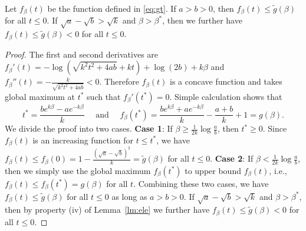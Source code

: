 \documentclass{article}
\begin{document}
\begin{lemma} \label{lm:tus}
Let $f_{\beta}(t)$ be the function defined in \eqref{eq:gt}. If $a>b>0$, then $f_{\beta}(t)\le \tilde{g}(\beta)$ for all $t\le 0$.
If $\sqrt{a}-\sqrt{b}>\sqrt{k}$
and $\beta>\beta^\ast$, then we further have $f_{\beta}(t)\le \tilde{g}(\beta)<0$ for all $t\le 0$.
\end{lemma}
\begin{proof}
The first and second derivatives are
$f_{\beta}'(t)=
-\log(\sqrt{k^2 t^2+4ab}+kt)+\log(2b) +k\beta$ and $f_{\beta}''(t)=-\frac{k}{\sqrt{k^2 t^2+4ab}}<0$.
Therefore $f_{\beta}(t)$ is a concave function and takes global maximum at $t^\ast$ such that $f_{\beta}'(t^\ast)=0$.
Simple calculation shows that 
$$
t^\ast=\frac{b e^{k\beta}-a e^{-k\beta}}{k} \quad \text{~and~} \quad
f_{\beta}(t^\ast)=\frac{b e^{k\beta}+a e^{-k\beta}}{k}-\frac{a+b}{k}+1
=g(\beta) .
$$
We divide the proof into two cases. {\bf Case 1}: If $\beta\ge \frac{1}{2k}\log\frac{a}{b}$, then $t^\ast\ge 0$. Since $f_{\beta}(t)$ is an increasing function for $t\le t^\ast$, we have $f_{\beta}(t)\le f_{\beta}(0)=1-\frac{(\sqrt{a}-\sqrt{b})^2}{k}= \tilde{g}(\beta)$ for all $t\le 0$.
{\bf Case 2}: If $\beta< \frac{1}{2k}\log\frac{a}{b}$, then we simply use the global maximum $f_{\beta}(t^\ast)$ to upper bound $f_{\beta}(t)$, i.e., $f_{\beta}(t)\le f_{\beta}(t^\ast)=g(\beta)$ for all $t$.
Combining these two cases, we have $f_{\beta}(t)\le \tilde{g}(\beta)$ for all $t\le 0$ as long as $a>b>0$.
If $\sqrt{a}-\sqrt{b}>\sqrt{k}$ and $\beta>\beta^\ast$, then by property (iv) of Lemma~\ref{lm:ele} we further have $f_{\beta}(t)\le \tilde{g}(\beta)<0$ for all $t\le 0$.
\end{proof}
\end{document}
